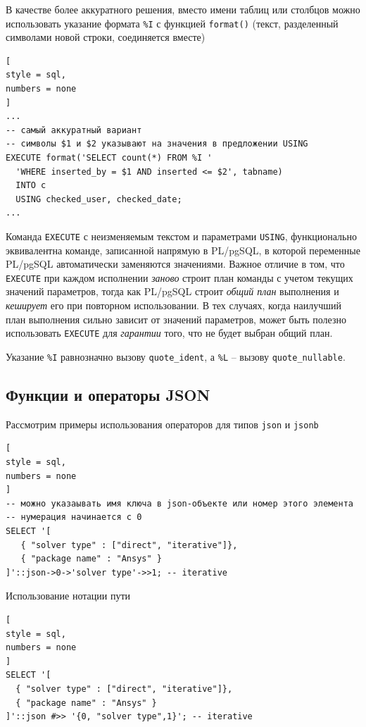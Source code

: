 \documentclass[%
	11pt,
	a4paper,
	utf8,
		]{article}
\begin{document}
В качестве более аккуратного решения, вместо имени таблиц или столбцов можно использовать указание формата \verb|%I| с функцией \texttt{format()} (текст, разделенный символами новой строки, соединяется вместе)
\begin{lstlisting}[
style = sql,
numbers = none
]
...
-- самый аккуратный вариант
-- символы $1 и $2 указывают на значения в предложении USING
EXECUTE format('SELECT count(*) FROM %I '
  'WHERE inserted_by = $1 AND inserted <= $2', tabname)
  INTO c
  USING checked_user, checked_date;
...
\end{lstlisting}


Команда \texttt{EXECUTE} с неизменяемым текстом и параметрами \texttt{USING}, функционально эквивалентна команде, записанной напрямую в PL/pgSQL, в которой переменные PL/pgSQL автоматически заменяются значениями. Важное отличие в том, что \texttt{EXECUTE} при каждом исполнении \emph{заново} строит план команды с учетом текущих значений параметров, тогда как PL/pgSQL строит \emph{общий план} выполнения и \emph{кеширует} его при повторном использовании. В тех случаях, когда наилучший план выполнения сильно зависит от значений параметров, может быть полезно использовать \texttt{EXECUTE} для \emph{гарантии} того, что не будет выбран общий план.

Указание \verb|%I| равнозначно вызову \texttt{quote\_ident}, а \verb|%L| -- вызову \texttt{quote\_nullable}. 

\subsection{Функции и операторы JSON}

Рассмотрим примеры использования операторов для типов \texttt{json} и \texttt{jsonb}
\begin{lstlisting}[
style = sql, 
numbers = none
]
-- можно указаывать имя ключа в json-объекте или номер этого элемента
-- нумерация начинается с 0
SELECT '[
   { "solver type" : ["direct", "iterative"]},
   { "package name" : "Ansys" }
]'::json->0->'solver type'->>1; -- iterative
\end{lstlisting}

Использование нотации пути
\begin{lstlisting}[
style = sql, 
numbers = none
]
SELECT '[
  { "solver type" : ["direct", "iterative"]},
  { "package name" : "Ansys" }
]'::json #>> '{0, "solver type",1}'; -- iterative
\end{lstlisting}
\end{document}
